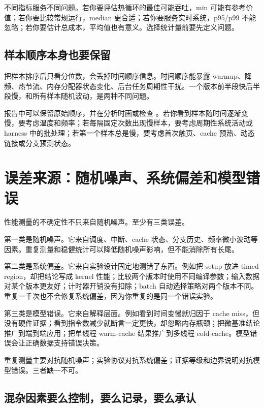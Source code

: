 不同指标服务不同问题。若你要评估热循环的最佳可能吞吐，min 可能有参考价值；若你要比较常规运行，median 更合适；若你要服务实时系统，p95/p99 不能忽略；若你要估计总成本，平均值也有意义。选择统计量前要先定义问题。

\subsection{样本顺序本身也要保留}

把样本排序后只看分位数，会丢掉时间顺序信息。时间顺序能暴露 warmup、降频、热节流、内存分配器状态变化、后台任务周期性干扰。一个版本前半段快后半段慢，和所有样本随机波动，是两种不同问题。

报告中可以保留原始顺序，并在分析时画或检查 。若你看到样本随时间逐渐变慢，要考虑温度和频率；若每隔固定次数出现慢样本，要考虑周期性系统活动或 harness 中的批处理；若第一个样本总是慢，要考虑首次触页、cache 预热、动态链接或分支预测状态。

\section{误差来源：随机噪声、系统偏差和模型错误}

性能测量的不确定性不只来自随机噪声。至少有三类误差。

第一类是随机噪声。它来自调度、中断、cache 状态、分支历史、频率微小波动等因素。重复测量和稳健统计可以降低随机噪声影响，但不能消除所有长尾。

第二类是系统偏差。它来自实验设计固定地测错了东西。例如把 setup 放进 timed region，却把结论写成 kernel 性能；比较两个版本时使用不同编译参数；输入数据对某个版本更友好；计时器开销没有扣除；batch 自动选择策略对两个版本不同。重复一千次也不会修复系统偏差，因为你重复的是同一个错误实验。

第三类是模型错误。它来自解释层面。例如看到时间变慢就归因于 cache miss，但没有硬件证据；看到指令数减少就断言一定更快，却忽略内存瓶颈；把微基准结论推广到端到端应用；把单线程 warm-cache 结果推广到多线程 cold-cache。模型错误会让正确数据支持错误决策。

\begin{mentalmodel}
重复测量主要对抗随机噪声；实验协议对抗系统偏差；证据等级和边界说明对抗模型错误。三者缺一不可。
\end{mentalmodel}

\subsection{混杂因素要么控制，要么记录，要么承认}

